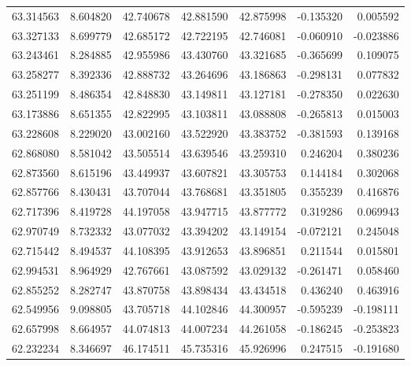 \begin{tabular}{rrrrrrr}
 63.314563 &   8.604820 &         42.740678 &         42.881590 &         42.875998 & -0.135320 &  0.005592 \\
 63.327133 &   8.699779 &         42.685172 &         42.722195 &         42.746081 & -0.060910 & -0.023886 \\
 63.243461 &   8.284885 &         42.955986 &         43.430760 &         43.321685 & -0.365699 &  0.109075 \\
 63.258277 &   8.392336 &         42.888732 &         43.264696 &         43.186863 & -0.298131 &  0.077832 \\
 63.251199 &   8.486354 &         42.848830 &         43.149811 &         43.127181 & -0.278350 &  0.022630 \\
 63.173886 &   8.651355 &         42.822995 &         43.103811 &         43.088808 & -0.265813 &  0.015003 \\
 63.228608 &   8.229020 &         43.002160 &         43.522920 &         43.383752 & -0.381593 &  0.139168 \\
 62.868080 &   8.581042 &         43.505514 &         43.639546 &         43.259310 &  0.246204 &  0.380236 \\
 62.873560 &   8.615196 &         43.449937 &         43.607821 &         43.305753 &  0.144184 &  0.302068 \\
 62.857766 &   8.430431 &         43.707044 &         43.768681 &         43.351805 &  0.355239 &  0.416876 \\
 62.717396 &   8.419728 &         44.197058 &         43.947715 &         43.877772 &  0.319286 &  0.069943 \\
 62.970749 &   8.732332 &         43.077032 &         43.394202 &         43.149154 & -0.072121 &  0.245048 \\
 62.715442 &   8.494537 &         44.108395 &         43.912653 &         43.896851 &  0.211544 &  0.015801 \\
 62.994531 &   8.964929 &         42.767661 &         43.087592 &         43.029132 & -0.261471 &  0.058460 \\
 62.855252 &   8.282747 &         43.870758 &         43.898434 &         43.434518 &  0.436240 &  0.463916 \\
 62.549956 &   9.098805 &         43.705718 &         44.102846 &         44.300957 & -0.595239 & -0.198111 \\
 62.657998 &   8.664957 &         44.074813 &         44.007234 &         44.261058 & -0.186245 & -0.253823 \\
 62.232234 &   8.346697 &         46.174511 &         45.735316 &         45.926996 &  0.247515 & -0.191680 \\

\end{tabular}
